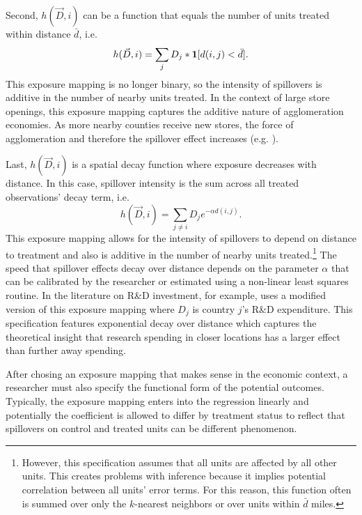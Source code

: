 \documentclass[11pt]{article}
\begin{document}
\begin{example}
    Second, $h(\vec{D}, i)$ can be a function that equals the number of units treated within distance $\bar{d}$, i.e. \begin{equation}\label{eq:h_within_additive}
        h(\vec{D}, i) = \sum_{j} D_j * \mathbf{1}[ d(i,j) < \bar{d} ].
    \end{equation}
    This exposure mapping is no longer binary, so the intensity of spillovers is additive in the number of nearby units treated. In the context of large store openings, this exposure mapping captures the additive nature of agglomeration economies. As more nearby counties receive new stores, the force of agglomeration and therefore the spillover effect increases (e.g. \citet{Basker_2005}).
\end{example}
    
\begin{example}
    Last, $h(\vec{D}, i)$ is a spatial decay function where exposure decreases with distance. In this case, spillover intensity is the sum across all treated observations' decay term, i.e. \begin{equation}\label{eq:h_decay}
        h(\vec{D}, i) = \sum_{j \neq i} D_j e^{-\alpha d(i,j)}.
    \end{equation} 
    This exposure mapping allows for the intensity of spillovers to depend on distance to treatment and also is additive in the number of nearby units treated.\footnote{However, this specification assumes that all units are affected by all other units. This creates problems with inference because it implies potential correlation between all units' error terms. For this reason, this function often is summed over only the $k$-nearest neighbors or over units within $\bar{d}$ miles.} The speed that spillover effects decay over distance depends on the parameter $\alpha$ that can be calibrated by the researcher or estimated using a non-linear least squares routine. In the literature on R\&D investment, for example, \citet{Keller_2002} uses a modified version of this exposure mapping where $D_j$ is country $j$'s R\&D expenditure. This specification features exponential decay over distance which captures the theoretical insight that research spending in closer locations has a larger effect than further away spending.
\end{example}

After chosing an exposure mapping that makes sense in the economic context, a researcher must also specify the functional form of the potential outcomes. Typically, the exposure mapping enters into the regression linearly and potentially the coefficient is allowed to differ by treatment status to reflect that spillovers on control and treated units can be different phenomenon. 
\end{document}
